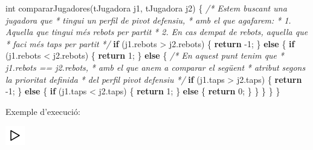 \documentclass[
]{book}
\newenvironment{Shaded}{\begin{snugshade}}{\end{snugshade}}
\newcommand{\CommentTok}[1]{\textcolor[rgb]{0.56,0.35,0.01}{\textit{#1}}}
\newcommand{\ControlFlowTok}[1]{\textcolor[rgb]{0.13,0.29,0.53}{\textbf{#1}}}
\newcommand{\DataTypeTok}[1]{\textcolor[rgb]{0.13,0.29,0.53}{#1}}
\newcommand{\DecValTok}[1]{\textcolor[rgb]{0.00,0.00,0.81}{#1}}
\newcommand{\NormalTok}[1]{#1}
\begin{document}
\begin{Shaded}
\begin{Highlighting}[]
\DataTypeTok{int}\NormalTok{ compararJugadores(tJugadora j1, tJugadora j2) \{}
    \CommentTok{/* Estem buscant una jugadora que }
\CommentTok{     * tingui un perfil de pivot defensiu, }
\CommentTok{     * amb el que agafarem:}
\CommentTok{     * 1. Aquella que tingui més rebots per partit}
\CommentTok{     * 2. En cas d\textquotesingle{}empat de rebots, aquella que}
\CommentTok{     *    faci més taps per partit}
\CommentTok{     */} 
    \ControlFlowTok{if}\NormalTok{ (j1.rebots \textgreater{} j2.rebots) \{}
        \ControlFlowTok{return}\NormalTok{ {-}}\DecValTok{1}\NormalTok{;}
\NormalTok{    \} }\ControlFlowTok{else}\NormalTok{ \{}
        \ControlFlowTok{if}\NormalTok{ (j1.rebots \textless{} j2.rebots) \{}
            \ControlFlowTok{return} \DecValTok{1}\NormalTok{;}
\NormalTok{        \} }\ControlFlowTok{else}\NormalTok{ \{}
            \CommentTok{/* En aquest punt tenim que }
\CommentTok{             * j1.rebots == j2.rebots,}
\CommentTok{             * amb el que anem a comparar el següent}
\CommentTok{             * atribut segons la prioritat definida}
\CommentTok{             * del perfil pivot defensiu}
\CommentTok{             */}
            \ControlFlowTok{if}\NormalTok{ (j1.taps \textgreater{} j2.taps) \{}
                \ControlFlowTok{return}\NormalTok{ {-}}\DecValTok{1}\NormalTok{;}
\NormalTok{            \} }\ControlFlowTok{else}\NormalTok{ \{}
                \ControlFlowTok{if}\NormalTok{ (j1.taps \textless{} j2.taps) \{}
                    \ControlFlowTok{return} \DecValTok{1}\NormalTok{;}
\NormalTok{                \} }\ControlFlowTok{else}\NormalTok{ \{}
                    \ControlFlowTok{return} \DecValTok{0}\NormalTok{;}
\NormalTok{                \}}
\NormalTok{            \}}
\NormalTok{        \}}
\NormalTok{    \}}
\NormalTok{\}}
\end{Highlighting}
\end{Shaded}

Exemple d'execució:

\includegraphics{./img/play.png}
\end{document}
